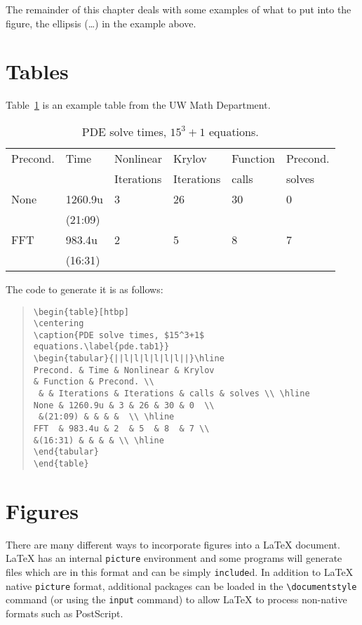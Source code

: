 The remainder of this chapter deals with some examples of what to put into the figure,
the ellipsis (\ldots ) in the example above.

\section{Tables}
Table~\ref{pde.tab1} is an example table from the UW Math Department.
\begin{table}[htbp]
\centering
\caption{PDE solve times, $15^3+1$
equations.\label{pde.tab1}}
\begin{tabular}{||l|l|l|l|l|l||}\hline
Precond. & Time & Nonlinear & Krylov
& Function & Precond. \\
 & & Iterations & Iterations & calls & solves \\ \hline
None & 1260.9u & 3 & 26 & 30 & 0  \\
 &(21:09) & & & &  \\ \hline
FFT  & 983.4u & 2  & 5  & 8  & 7 \\
&(16:31) & & & & \\ \hline
\end{tabular}
\end{table}
The code to generate it is as follows:
\begin{quote}\tt\singlespace\begin{verbatim}
\begin{table}[htbp]
\centering
\caption{PDE solve times, $15^3+1$
equations.\label{pde.tab1}}
\begin{tabular}{||l|l|l|l|l|l||}\hline
Precond. & Time & Nonlinear & Krylov
& Function & Precond. \\
 & & Iterations & Iterations & calls & solves \\ \hline
None & 1260.9u & 3 & 26 & 30 & 0  \\
 &(21:09) & & & &  \\ \hline
FFT  & 983.4u & 2  & 5  & 8  & 7 \\
&(16:31) & & & & \\ \hline
\end{tabular}
\end{table}
\end{verbatim}\end{quote}

\section{Figures}
There are many different ways to incorporate figures into a \LaTeX{}
document.  \LaTeX{} has an internal {\tt picture} environment and
some programs will generate files which are in this format and can
be simply {\tt include}d.  In addition to \LaTeX{} native {\tt picture}
format, additional packages can be loaded in the {\tt\verb|\documentstyle|}
command (or using the {\tt input} command) to allow \LaTeX{} to process
non-native formats such as PostScript.

